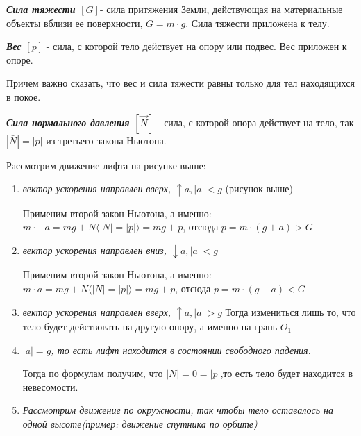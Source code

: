 \begin{enumerate}
           \textbf{\textit{Сила тяжести $[G]$}}- сила притяжения Земли, действующая на материальные объекты вблизи ее поверхности, $G = m \cdot g$. Сила тяжести приложена к телу.

           \textbf{\textit{Вес $[p]$}} - сила, с которой тело действует на опору или подвес. Вес приложен к опоре.

          Причем важно сказать, что вес и сила тяжести равны только для тел находящихся в покое.

           \textbf{\textit{Сила нормального давления $[\vec N]$}} - сила, с которой опора действует на тело, так $|\bar N| = | p |$ из третьего закона Ньютона.

          \vspace{5px}

          Рассмотрим движение лифта на рисунке выше:
          \begin{enumerate}
              \item \textit{вектор ускорения направлен вверх, $\uparrow a, |a| < g$}
                    (рисунок выше)

                    \vspace{5px}

                    Применим второй закон Ньютона, а именно: $m \cdot -a = mg + N \langle |N| = |p| \rangle = mg + p$, отсюда $p = m \cdot (g+a) > G $
              \item \textit{вектор ускорения направлен вниз, $\downarrow a, |a| < g$}

                    \vspace{5px}

                    Применим второй закон Ньютона, а именно: $m \cdot a = mg + N \langle |N| = |p| \rangle = mg + p$, отсюда $p = m \cdot (g-a)  <  G $
              \item \textit{вектор ускорения направлен вверх, $\uparrow a, |a| > g$}
                    Тогда измениться лишь то, что тело будет действовать на другую опору, а именно на грань $O_1$

                    \vspace{5px}

              \item \textit{$|a| = g$, то есть лифт находится в состоянии свободного падения. }

                    \vspace{5px}

                    Тогда по формулам получим, что $|N| = 0 = |p|$,то есть тело будет находится в невесомости.
              \item \textit{Рассмотрим движение по окружности, так чтобы тело оставалось на одной высоте(пример: движение спутника по орбите)}


\end{enumerate}
\end{enumerate}
